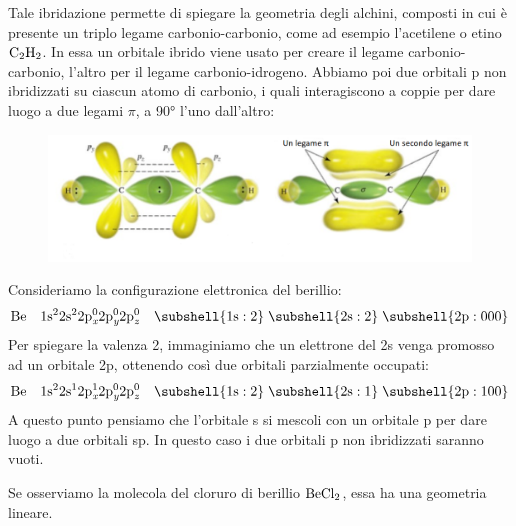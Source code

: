 Tale ibridazione permette di spiegare la geometria degli alchini, composti in cui è presente un triplo legame carbonio-carbonio, come ad esempio l'acetilene o etino $\rm C_2H_2$. In essa un orbitale ibrido viene usato per creare il legame carbonio-carbonio, l'altro per il legame carbonio-idrogeno. Abbiamo poi due orbitali p non ibridizzati su ciascun atomo di carbonio, i quali interagiscono a coppie per dare luogo a due legami $\pi$, a 90° l'uno dall'altro:

\begin{figure}[htp]
    \centering
    \includegraphics[width=14cm]{immagini/acetilene.png}
\end{figure}

Consideriamo la configurazione elettronica del berillio:
$$\rm Be \quad 1s^22s^22p_{\textit{x}}^02p_{\textit{y}}^02p_{\textit{z}}^0 \quad \subshell{1s:2} \; \subshell{2s:2} \; \subshell{2p:000}$$
Per spiegare la valenza 2, immaginiamo che un elettrone del 2s venga promosso ad un orbitale 2p, ottenendo così due orbitali parzialmente occupati:
$$\rm Be \quad 1s^22s^12p_{\textit{x}}^12p_{\textit{y}}^02p_{\textit{z}}^0 \quad \subshell{1s:2} \; \subshell{2s:1} \; \subshell{2p:100}$$
A questo punto pensiamo che l'orbitale s si mescoli con un orbitale p per dare luogo a due orbitali sp. In questo caso i due orbitali p non ibridizzati saranno vuoti. 

Se osserviamo la molecola del cloruro di berillio $\rm BeCl_2$, essa ha una geometria lineare.
